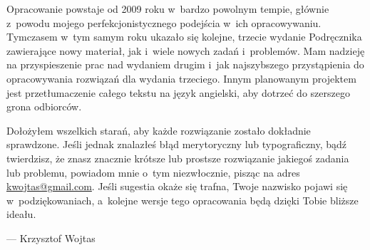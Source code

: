 Opracowanie powstaje od 2009 roku w~bardzo powolnym tempie, głównie z~powodu mojego perfekcjonistycznego podejścia w~ich opracowywaniu.
Tymczasem w~tym samym roku ukazało się kolejne, trzecie wydanie Podręcznika \cite{cormen3} zawierające nowy materiał, jak i~wiele nowych zadań i~problemów.
Mam nadzieję na przyspieszenie prac nad wydaniem drugim i~jak najszybszego przystąpienia do opracowywania rozwiązań dla wydania trzeciego.
Innym planowanym projektem jest przetłumaczenie całego tekstu na język angielski, aby dotrzeć do szerszego grona odbiorców.

Dołożyłem wszelkich starań, aby każde rozwiązanie zostało dokładnie sprawdzone.
Jeśli jednak znalazłeś błąd merytoryczny lub typograficzny, bądź twierdzisz, że znasz znacznie krótsze lub prostsze rozwiązanie jakiegoś zadania lub problemu, powiadom mnie o~tym niezwłocznie, pisząc na adres \url{kwojtas@gmail.com}.
Jeśli sugestia okaże się trafna, Twoje nazwisko pojawi się w~podziękowaniach, a~kolejne wersje tego opracowania będą dzięki Tobie bliższe ideału.

\bigskip
\bigskip
{}\hfill--- Krzysztof Wojtas
